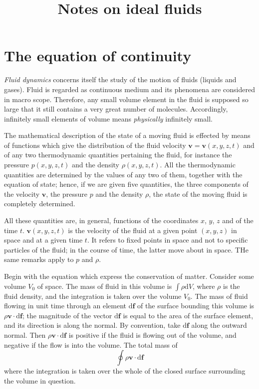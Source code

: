 \documentclass[conference]{IEEEtran}
\theoremstyle{definition}
\theoremstyle{remark}
\begin{document}
    \title{Notes on ideal fluids}

    \author{}

    \maketitle

    \section{The equation of continuity}
    
    \emph{Fluid dynamics} concerns itself the study of the motion of fluids (liquids and gases). Fluid is regarded as continuous medium and its phenomena are considered in macro scope. Therefore, any small volume element in the fluid is supposed so large that it still contains a very great number of molecules. Accordingly, infinitely small elements of volume means \emph{physically} infinitely small.

    The mathematical description of the state of a moving fluid is effected by means of functions which give the distribution of the fluid velocity $\mathbf{v} = \mathbf{v}(x, y, z, t)$ and of any two thermodynamic quantities pertaining the fluid, for instance the pressure $p(x, y, z, t)$ and the density $\rho(x, y, z, t)$. All the thermodynamic quantities are determined by the values of any two of them, together with the equation of state; hence, if we are given five quantities, the three components of the velocity $\mathbf{v}$, the pressure $p$ and the density $\rho$, the state of the moving fluid is completely determined.

    All these quantities are, in general, functions of the coordinates $x$, $y$, $z$ and of the time $t$. $\mathbf{v}(x, y, z, t)$ is the velocity of the fluid at a given point $(x, y, z)$ in space and at a given time $t$. It refers to fixed points in space and not to specific particles of the fluid; in the course of time, the latter move about in space. THe same remarks apply to $p$ and $\rho$.

    Begin with the equation which express the conservation of matter. Consider some volume $V_0$ of space. The mass of fluid in this volume is $\int \rho \mathrm{d} V$, where $\rho$ is the fluid density, and the integration is taken over the volume $V_0$. The mass of fluid flowing in unit time through an element $\mathrm{d} \mathbf{f}$ of the surface bounding this volume is $\rho \mathbf{v} \cdot \mathrm{d} \mathbf{f}$; the magnitude of the vector $\mathrm{d} \mathbf{f}$ is equal to the area of the surface element, and its direction is along the normal. By convention, take $\mathrm{d} \mathbf{f}$ along the outward normal. Then $\rho \mathbf{v} \cdot \mathrm{d} \mathbf{f}$ is positive if the fluid is flowing out of the volume, and negative if the flow is into the volume. The total mass of
    \[
        \oint \rho \mathbf{v} \cdot \mathrm{d} \mathbf{f}
    \]
    where the integration is taken over the whole of the closed surface surrounding the volume in question.
\end{document}
